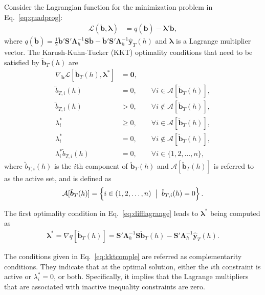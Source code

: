 \documentclass[11pt]{article}
\newcommand{\0}{\phantom{0}}
\begin{document}
Consider the Lagrangian function for the minimization problem in Eq.\ \eqref{eq:quadprog}:
\begin{align*}
\mathcal{L}(\ddot{\bm{b}}, \bm{\lambda}) & = q(\ddot{\bm{b}}) - \bm{\lambda}'\ddot{\bm{b}},
\end{align*}
where $q(\ddot{\bm{b}}) = \frac{1}{2}\ddot{\bm{b}}'\bm{S}'\bm{\Lambda}^{-1}_{h}\bm{S}\ddot{\bm{b}} - \ddot{\bm{b}}'\bm{S}'\bm{\Lambda}^{-1}_{h}\hat{\bm{y}}_{T}(h)$ and $\bm{\lambda}$ is a Lagrange multiplier vector. The Karush-Kuhn-Tucker (KKT) optimality conditions that need to be satisfied by $\breve{\bm{b}}_{T}(h)$ are
\begin{subequations}
	\label{eq:optcond}
	\begin{align}
	\label{eq:difflagrange}
	\nabla_{\bm{b}} \mathcal{L}[\breve{\bm{b}}_{T}(h), \bm{\lambda}^{*}] & = \bm{0},\\ 
	\breve{b}_{T, i}(h) & = 0, \qquad \forall i \in \mathcal{A}[\breve{\bm{b}}_{T}(h)],\\
	\breve{b}_{T, i}(h) & > 0, \qquad \forall i \notin \mathcal{A}[\breve{\bm{b}}_{T}(h)],\\
	\lambda^{*}_{i} & \geq 0, \qquad \forall i \in \mathcal{A}[\breve{\bm{b}}_{T}(h)],\\
	\lambda^{*}_{i} & = 0, \qquad \forall i \notin \mathcal{A}[\breve{\bm{b}}_{T}(h)],\\
	\lambda_{i}^{*} \breve{b}_{T, i}(h) & = 0, \qquad \forall i \in \{1, 2, \dots, n\}, \label{eq:kktcomple}
	\end{align}
\end{subequations}
where $\breve{b}_{T, i}(h)$ is the $i$th component of $\breve{\bm{b}}_{T}(h)$ and $\mathcal{A}[\breve{\bm{b}}_{T}(h)]$ is referred to as the active set, and is defined as
\begin{align*}
\mathcal{A}[\breve{\bm{b}}_{T}(h)] = \left\{i \in (1, 2, \dots, n) \hspace*{2mm} \big|\hspace*{2mm} \breve{b}_{T, i}(h) = 0\right\}.
\end{align*}

The first optimality condition in Eq.\ \eqref{eq:difflagrange} leads to $\bm{\lambda}^{*}$ being computed as
\begin{align*}
\bm{\lambda}^{*} = \nabla q[\breve{\bm{b}}_{T}(h)] = \bm{S}'\bm{\Lambda}^{-1}_{h}\bm{S}\breve{\bm{b}}_{T}(h) - \bm{S}'\bm{\Lambda}^{-1}_{h}\hat{\bm{y}}_{T}(h).
\end{align*}

The conditions given in Eq.\ \eqref{eq:kktcomple} are referred as complementarity conditions. They indicate that at the optimal solution, either the $i$th constraint is active or $\lambda_{i}^{*} = 0$, or both. Specifically, it implies that the Lagrange multipliers that are associated with inactive inequality constraints are zero.
\end{document}
